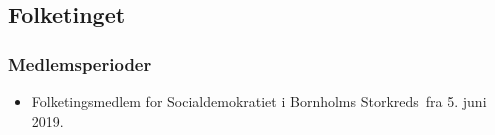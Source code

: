 \documentclass[11pt, a4paper]{awesome-cv}
\begin{document}
\makecvheader[R]
\makelettertitle
\begin{cvletter}
\subsection*{Folketinget}
\subsubsection*{Medlemsperioder}
\begin{itemize}
\item Folketingsmedlem for Socialdemokratiet i Bornholms Storkreds fra 5. juni 2019.
\end{itemize}
\end{cvletter}
\end{document}
